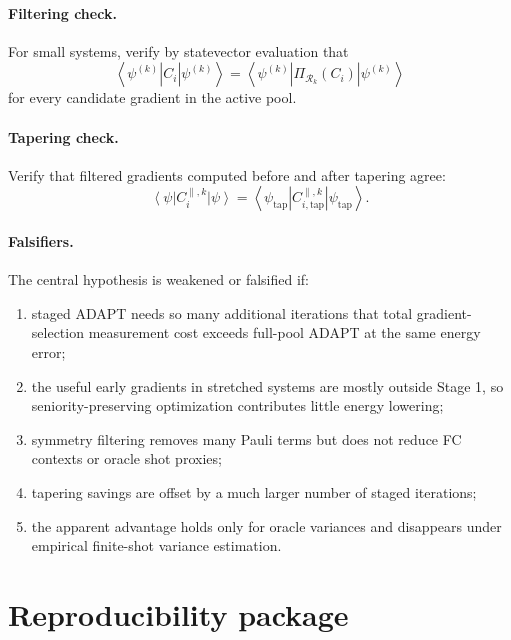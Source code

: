 \documentclass[11pt]{article}
\newcommand{\ket}[1]{\left|#1\right\rangle}
\newcommand{\bra}[1]{\left\langle#1\right|}
\begin{document}
\paragraph{Filtering check.}
For small systems, verify by statevector evaluation that
\begin{equation}
    \bra{\psi^{(k)}}C_i\ket{\psi^{(k)}}
    =\bra{\psi^{(k)}}\Pi_{\mathcal R_k}(C_i)\ket{\psi^{(k)}}
\end{equation}
for every candidate gradient in the active pool.

\paragraph{Tapering check.}
Verify that filtered gradients computed before and after tapering agree:
\begin{equation}
    \bra{\psi}C_i^{\parallel,k}\ket{\psi}
    =\bra{\psi_{\mathrm{tap}}}C_{i,\mathrm{tap}}^{\parallel,k}\ket{\psi_{\mathrm{tap}}}.
\end{equation}

\paragraph{Falsifiers.}
The central hypothesis is weakened or falsified if:
\begin{enumerate}[label=(\roman*),leftmargin=2.4em]
    \item staged ADAPT needs so many additional iterations that total gradient-selection measurement cost exceeds full-pool ADAPT at the same energy error;
    \item the useful early gradients in stretched systems are mostly outside Stage 1, so seniority-preserving optimization contributes little energy lowering;
    \item symmetry filtering removes many Pauli terms but does not reduce FC contexts or oracle shot proxies;
    \item tapering savings are offset by a much larger number of staged iterations;
    \item the apparent advantage holds only for oracle variances and disappears under empirical finite-shot variance estimation.
\end{enumerate}

\section{Reproducibility package}
\end{document}
